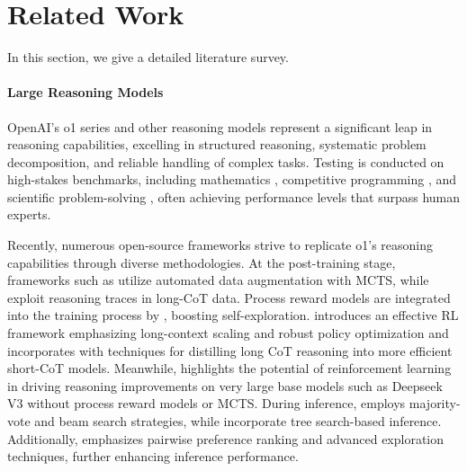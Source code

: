 \section{Related Work}
\label{sec:related-work}

In this section, we give a detailed literature survey.

\paragraph{Large Reasoning Models}
OpenAI’s o1 series \cite{openai-o1-mini, openai-o1, jaech2024openai} and other reasoning models \cite{gemini-2,deepseek-r1, qwq} represent a significant leap in reasoning capabilities, excelling in structured reasoning, systematic problem decomposition, and reliable handling of complex tasks. 
Testing is conducted on high-stakes benchmarks, including mathematics \cite{hendrycks2021measuring,gsm8k,aime24,amc23,math500}, competitive programming \cite{jain2024livecodebench,humaneval,codeforces}, and scientific problem-solving \cite{hendrycks2020measuring,rein2023gpqa}, often achieving performance levels that surpass human experts.

Recently, numerous open-source frameworks strive to replicate o1’s reasoning capabilities through diverse methodologies. At the post-training stage, frameworks such as \cite{wang2024openr, zhang2024rest, zhang2024llama} utilize automated data augmentation with MCTS, while \cite{huang2024o1, huang2025o1replicationjourney, skyt1, min2024imitate} exploit reasoning traces in long-CoT data. Process reward models are integrated into the training process by \cite{cui2024process, guan2025rstar}, boosting self-exploration. 
\cite{kimi-k15} introduces an effective RL framework emphasizing long-context scaling and robust policy optimization and incorporates with techniques for distilling long CoT reasoning into more efficient short-CoT models.
Meanwhile, \cite{deepseek-r1} highlights the potential of reinforcement learning in driving reasoning improvements on very large base models such as Deepseek V3 without process reward models or MCTS.
During inference, \cite{wang2024openr} employs majority-vote and beam search strategies, while \cite{zhang2024rest, qin2024o1, guan2025rstar, jiang2024technical} incorporate tree search-based inference. Additionally, \cite{zhang2024llama} emphasizes pairwise preference ranking and advanced exploration techniques, further enhancing inference performance.




